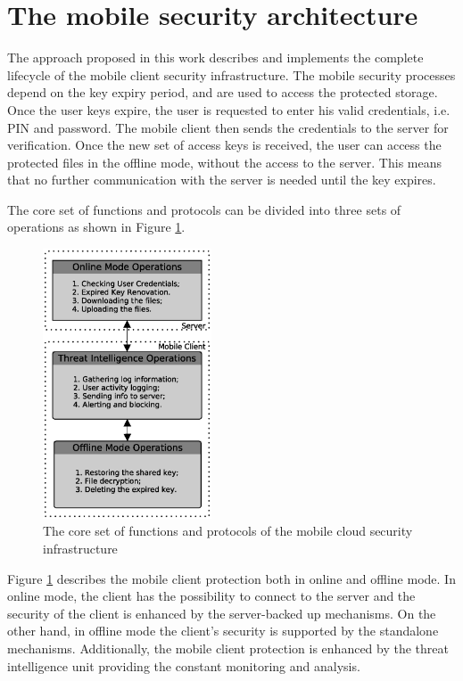 \documentclass[twocolumn]{svjour3}          	%
\begin{document}
\section{The mobile security architecture}
\label{sec_the_client_security_architecture}
The approach proposed in this work describes and implements the complete lifecycle of the mobile client security infrastructure. The mobile security processes depend on the key expiry period, and are used to access the protected storage. Once the user keys expire, the user is requested to enter his valid credentials, i.e. PIN and password. The mobile client then sends the credentials to the server for verification. Once the new set of access keys is received, the user can access the protected files in the offline mode, without the access to the server. This means that no further communication with the server is needed until the key expires. 

The core set of functions and protocols can be divided into three sets of operations as shown in Figure \ref{fig:01}.

\begin{figure}[h!]
	\centering
	\includegraphics[width=5cm]{fig01.eps}
	\caption{The core set of functions and protocols of the mobile cloud security infrastructure}
	\label{fig:01}
\end{figure}

Figure \ref{fig:01} describes the mobile client protection both in online and offline mode. In online mode, the client has the possibility to connect to the server and the security of the client is enhanced by the server-backed up mechanisms. On the other hand, in offline mode the client’s security is supported by the standalone mechanisms. Additionally, the mobile client protection is enhanced by the threat intelligence unit providing the constant monitoring and analysis.
\end{document}
